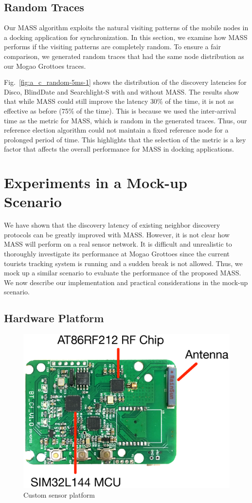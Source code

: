 \documentclass[twoside,twocolumn]{article}
\begin{document}
\subsection{Random Traces}

Our MASS algorithm exploits the natural visiting patterns of the
mobile nodes in a docking application for synchronization.  In this
section, we examine how MASS performs if the visiting patterns are
completely random. To ensure a fair comparison, we generated random
traces that had the same node distribution as our Mogao Grottoes
traces.

Fig.~\ref{fig:a_c_random-5ms-1} shows the distribution of the
discovery latencies for Disco, BlindDate and Searchlight-S with and
without MASS. The results show that while MASS could still improve the
latency 30\% of the time, it is not as effective as before (75\% of
the time).  This is because we used the inter-arrival time as the
metric for MASS, which is random in the generated traces. Thus, our
reference election algorithm could not maintain a fixed reference node
for a prolonged period of time. This highlights that the selection of
the metric is a key factor that affects the overall performance for
MASS in docking applications.

\section{Experiments in a Mock-up Scenario}
\label{sec:mock-up}
We have shown that the discovery latency of existing neighbor discovery
protocols can be greatly improved with MASS. However, it is not clear 
how MASS will perform on a real sensor network. It is difficult and
unrealistic to thoroughly investigate its performance at Mogao Grottoes
since the current tourists tracking system is running and a sudden break
is not allowed. Thus, we mock up a similar scenario to evaluate the 
performance of the proposed MASS. We now describe our implementation and
practical considerations in the mock-up scenario.

\subsection{Hardware Platform}
\begin{figure}[t]
   \centering
   \includegraphics[width=.7\columnwidth]{static/sensor}
   \caption{Custom sensor platform}
   \label{fig:node}
\end{figure}
\end{document}
